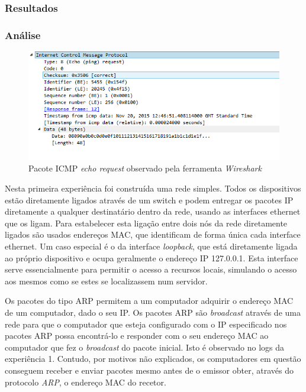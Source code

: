 \documentclass{article}
\begin{document}
\subsubsection{Resultados}

\subsubsection{Análise}


\begin{figure}
\centering
\includegraphics[width=1.0\textwidth]{icmp_packet.PNG}
\caption{Pacote ICMP \textit{echo request} observado pela ferramenta \textit{Wireshark}}
\label{fig:icmp}
\end{figure}


Nesta primeira experiência foi construída uma rede simples. Todos os dispositivos estão diretamente ligados através de um switch e podem entregar os pacotes IP diretamente a qualquer destinatário dentro da rede, usando as interfaces ethernet que os ligam. Para estabelecer esta ligação entre dois nós da rede diretamente ligados são usados endereços MAC, que identificam de forma única cada interface ethernet. Um caso especial é o da interface \textit{loopback}, que está diretamente ligada ao próprio dispositivo e ocupa geralmente o endereço IP 127.0.0.1. Esta interface serve essencialmente para permitir o acesso a recursos locais, simulando o acesso aos mesmos como se estes se localizassem num servidor.

Os pacotes do tipo ARP permitem a um computador adquirir o endereço MAC de um computador, dado o seu IP. Os pacotes ARP são \textit{broadcast} através de uma rede para que o computador que esteja configurado com o IP especificado nos pacotes ARP possa encontrá-lo e responder com o seu endereço MAC ao computador que fez o \textit{broadcast} do pacote inicial. Isto é observado no logs da experiência 1. Contudo, por motivos não explicados, os computadores em questão conseguem receber e enviar pacotes mesmo antes de o emissor obter, através do protocolo \textit{ARP}, o endereço MAC do recetor.
\end{document}
